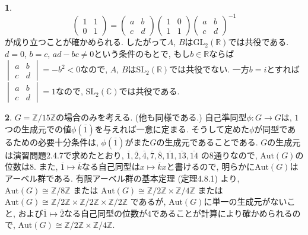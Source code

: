 \documentclass{amsart}
\theoremstyle{definition}
\newtheorem{ans}{}
\numberwithin{ans}{subsection}
\newcommand{\Z}[1]{\mathbb{Z}/#1\mathbb{Z}}
\begin{document}
\begin{ans}
  \[
    \begin{pmatrix}
      1 & 1 \\
      0 & 1
    \end{pmatrix} = \begin{pmatrix}
      a & b \\
      c & d
    \end{pmatrix} \begin{pmatrix}
      1 & 0 \\
      1 & 1
    \end{pmatrix} \begin{pmatrix}
      a & b \\
      c & d
    \end{pmatrix}^{-1}
  \]
  が成り立つことが確かめられる.
  したがって$A$, $B$は$\mathrm{GL}_2(\mathbb{R})$では共役である.
  $d = 0$, $b = c$, $ad - bc \neq 0$という条件のもとで, もし$b \in \mathbb{R}$ならば$
  \begin{vmatrix}
    a & b \\
    c & d
  \end{vmatrix} = - b^2 < 0
  $なので, $A$, $B$は$\mathrm{SL}_2(\mathbb{R})$では共役でない.
  一方$b = i$とすれば$
  \begin{vmatrix}
    a & b \\
    c & d
  \end{vmatrix} = 1
  $なので, $\mathrm{SL}_2(\mathbb{C})$では共役である.
\end{ans}

\begin{ans}
  $G = \Z{15}$の場合のみを考える. (他も同様である.)
  自己準同型$\phi: G \rightarrow G$は,
  $1$つの生成元での値$\phi(\overline{1})$を与えれば一意に定まる.
  そうして定めた$\phi$が同型であるための必要十分条件は, $\phi(\overline{1})$がまた$G$の生成元であることである.
  $G$の生成元は演習問題2.4.7で求めたとおり,
  $\overline{1}, \overline{2}, \overline{4}, \overline{7}, \overline{8}, \overline{11}, \overline{13}, \overline{14}$
  の$8$通りなので, $\mathrm{Aut}(G)$の位数は$8$.
  また, $\overline{1} \mapsto \overline{k}$なる自己同型は$x \mapsto \overline{k}x$と書けるので,
  明らかに$\mathrm{Aut}(G)$はアーベル群である.
  有限アーベル群の基本定理 (定理4.8.1) より,
  $\mathrm{Aut}(G) \cong \Z{8}$
  または
  $\mathrm{Aut}(G) \cong \Z{2} \times \Z{4}$
  または
  $\mathrm{Aut}(G) \cong \Z{2} \times \Z{2} \times \Z{2}$
  であるが, $\mathrm{Aut}(G)$に単一の生成元がないこと,
  および$\overline{1} \mapsto \overline{2}$なる自己同型の位数が$4$であることが計算により確かめられるので,
  $\mathrm{Aut}(G) \cong \Z{2} \times \Z{4}$.
\end{ans}
\end{document}
